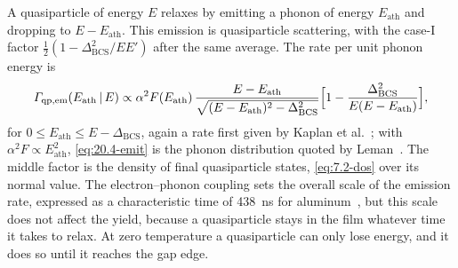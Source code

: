 A quasiparticle of energy $E$ relaxes by emitting a phonon of energy $E_{\mathrm{ath}}$ and dropping to $E - E_{\mathrm{ath}}$. This emission is quasiparticle scattering, with the case-I factor $\frac12(1 - \Delta_{\mathrm{BCS}}^2/EE')$ after the same average. The rate per unit phonon energy is
\begin{equation}
  \varGamma_{\mathrm{qp,em}}(E_{\mathrm{ath}}\,|\,E) \propto \alpha^2F(E_{\mathrm{ath}})\,\frac{E - E_{\mathrm{ath}}}{\sqrt{(E - E_{\mathrm{ath}})^2 - \Delta_{\mathrm{BCS}}^2}}\Bigl[1 - \frac{\Delta_{\mathrm{BCS}}^2}{E(E - E_{\mathrm{ath}})}\Bigr] ,
  \label{eq:20.4-emit}
\end{equation}
for $0 \le E_{\mathrm{ath}} \le E - \Delta_{\mathrm{BCS}}$, again a rate first given by Kaplan et al.~\cite{kaplan1976quasiparticle}; with $\alpha^2F \propto E_{\mathrm{ath}}^2$, \cref{eq:20.4-emit} is the phonon distribution quoted by Leman~\cite[Sect.~IV]{leman2012invited}. The middle factor is the density of final quasiparticle states, \cref{eq:7.2-dos} over its normal value. The electron--phonon coupling sets the overall scale of the emission rate, expressed as a characteristic time of \SI{438}{ns} for aluminum~\cite[p.~3]{guruswamy2014quasiparticle}, but this scale does not affect the yield, because a quasiparticle stays in the film whatever time it takes to relax. At zero temperature a quasiparticle can only lose energy, and it does so until it reaches the gap edge.

